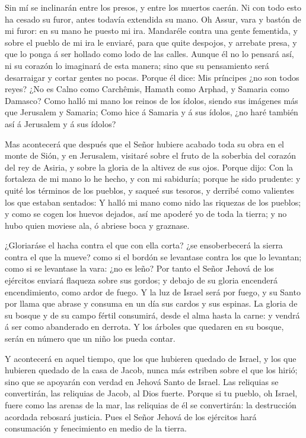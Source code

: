  Sin mí se inclinarán entre los presos, y entre los muertos
caerán. Ni con todo esto ha cesado su furor, antes todavía extendida su
mano.  Oh Assur, vara y bastón de mi furor: en su mano he
puesto mi ira.  Mandaréle contra una gente fementida, y
sobre el pueblo de mi ira le enviaré, para que quite despojos, y
arrebate presa, y que lo ponga á ser hollado como lodo de las calles.
 Aunque él no lo pensará así, ni su corazón lo imaginará de
esta manera; sino que su pensamiento será desarraigar y cortar gentes no
pocas.  Porque él dice: Mis príncipes ¿no son todos reyes?
 ¿No es Calno como Carchêmis, Hamath como Arphad, y Samaria
como Damasco?  Como halló mi mano los reinos de los ídolos,
siendo sus imágenes más que Jerusalem y Samaria;  Como hice
á Samaria y á sus ídolos, ¿no haré también así á Jerusalem y á sus
ídolos?

 Mas acontecerá que después que el Señor hubiere acabado
toda su obra en el monte de Sión, y en Jerusalem, visitaré sobre el
fruto de la soberbia del corazón del rey de Asiria, y sobre la gloria de
la altivez de sus ojos.  Porque dijo: Con la fortaleza de
mi mano lo he hecho, y con mi sabiduría; porque he sido prudente: y
quité los términos de los pueblos, y saqueé sus tesoros, y derribé como
valientes los que estaban sentados:  Y halló mi mano como
nido las riquezas de los pueblos; y como se cogen los huevos dejados,
así me apoderé yo de toda la tierra; y no hubo quien moviese ala, ó
abriese boca y graznase.

 ¿Gloriaráse el hacha contra el que con ella corta? ¿se
ensoberbecerá la sierra contra el que la mueve? como si el bordón se
levantase contra los que lo levantan; como si se levantase la vara: ¿no
es leño?  Por tanto el Señor Jehová de los ejércitos
enviará flaqueza sobre sus gordos; y debajo de su gloria encenderá
encendimiento, como ardor de fuego.  Y la luz de Israel
será por fuego, y su Santo por llama que abrase y consuma en un día sus
cardos y sus espinas.  La gloria de su bosque y de su campo
fértil consumirá, desde el alma hasta la carne: y vendrá á ser como
abanderado en derrota.  Y los árboles que quedaren en su
bosque, serán en número que un niño los pueda contar.

 Y acontecerá en aquel tiempo, que los que hubieren quedado
de Israel, y los que hubieren quedado de la casa de Jacob, nunca más
estriben sobre el que los hirió; sino que se apoyarán con verdad en
Jehová Santo de Israel.  Las reliquias se convertirán, las
reliquias de Jacob, al Dios fuerte.  Porque si tu pueblo,
oh Israel, fuere como las arenas de la mar, las reliquias de él se
convertirán: la destrucción acordada rebosará justicia. 
Pues el Señor Jehová de los ejércitos hará consumación y fenecimiento en
medio de la tierra.

